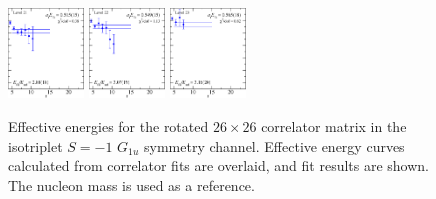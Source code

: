 \begin{figure}[H]
    \includegraphics[width=0.18\textwidth]{figures/sigmas/g1u/fits/fit_19.pdf}
    \includegraphics[width=0.18\textwidth]{figures/sigmas/g1u/fits/fit_21.pdf}
    \includegraphics[width=0.18\textwidth]{figures/sigmas/g1u/fits/fit_23.pdf}
    \caption{Effective energies for the rotated $26\times 26$ correlator matrix in the isotriplet $S=-1$ $G_{1u}$ symmetry channel. Effective energy curves calculated from correlator fits are overlaid, and fit results are shown. The nucleon mass is used as a reference.}\label{fig:g1u_fits}
\end{figure}

